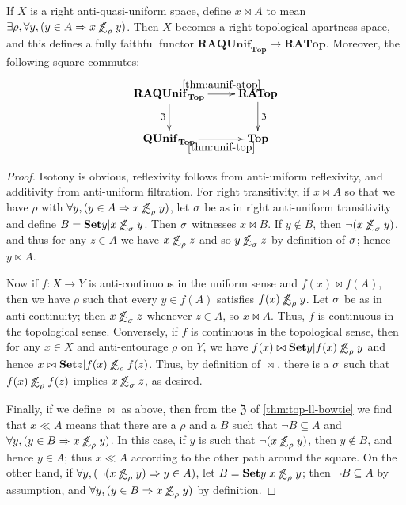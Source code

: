 \documentclass{article}
\def\oapt{\mathrel{\!\not\,\not\lesssim}}
\def\aent#1{\oapt_{#1}}
\def\cpl#1{\neg #1}
\let\implies\Rightarrow
\def\neigh{\mathfrak{Z}}
\def\Top{\mathbf{Top}}
\def\RATop{\mathbf{RATop}}
\def\QUnifTop{\mathbf{QUnif}_{\mathbf{Top}}}
\def\RAQUnifTop{\mathbf{RAQUnif}_{\mathbf{Top}}}
\begin{document}
\begin{thm}\label{thm:aunif-atop}
  If $X$ is a right anti-quasi-uniform space, define $x\bowtie A$ to mean $\exists\rho, \forall y, (y\in A \implies x\aent\rho y)$.
  Then $X$ becomes a right topological apartness space, and this defines a fully faithful functor $\RAQUnifTop \to \RATop$.
  Moreover, the following square commutes:
  \[ \xymatrix{
    \RAQUnifTop \ar[r]^-{\ref{thm:aunif-atop}} \ar[d]_{\neigh} & \RATop \ar[d]^{\neigh}\\
    \QUnifTop \ar[r]_-{\ref{thm:unif-top}} & \Top  }\]
\end{thm}
\begin{proof}
  Isotony is obvious, reflexivity follows from anti-uniform reflexivity, and additivity from anti-uniform filtration.
  For right transitivity, if $x\bowtie A$ so that we have $\rho$ with $\forall y, (y\in A \implies x\aent\rho y)$, let $\sigma$ be as in right anti-uniform transitivity and define $B = \setof{ y | x\aent\si y}$.
  Then $\sigma$ witnesses $x\bowtie B$.
  If $y\notin B$, then $\neg (x\aent\si y)$, and thus for any $z\in A$ we have $x\aent\rho z$ and so $y\aent\si z$ by definition of $\sigma$; hence $y\bowtie A$.

  Now if $f:X\to Y$ is anti-continuous in the uniform sense and $f(x)\bowtie f(A)$, then we have $\rho$ such that every $y\in f(A)$ satisfies $f(x)\aent\rho y$.
  Let $\sigma$ be as in anti-continuity; then $x\aent\si z$ whenever $z\in A$, so $x\bowtie A$.
  Thus, $f$ is continuous in the topological sense.
  Conversely, if $f$ is continuous in the topological sense, then for any $x\in X$ and anti-entourage $\rho$ on $Y$, we have $f(x) \bowtie \setof{y | f(x) \aent\rho y}$ and hence $x \bowtie \setof{z | f(x) \aent\rho f(z) }$.
  Thus, by definition of $\bowtie$, there is a $\sigma$ such that $f(x)\aent\rho f(z)$ implies $x\aent\si z$, as desired.

  Finally, if we define $\bowtie$ as above, then from the $\neigh$ of \cref{thm:top-ll-bowtie} we find that $x\ll A$ means that there are a $\rho$ and a $B$ such that $\cpl{B}\subseteq A$ and $\forall y, (y\in B \implies x\aent\rho y)$.
  In this case, if $y$ is such that $\neg(x\aent\rho y)$, then $y\notin B$, and hence $y\in A$; thus $x\ll A$ according to the other path around the square.
  On the other hand, if $\forall y, (\neg(x\aent\rho y) \implies y\in A)$, let $B = \setof{y | x\aent\rho y}$; then $\cpl{B}\subseteq A$ by assumption, and $\forall y, (y\in B \implies x\aent\rho y)$ by definition.
\end{proof}
\end{document}
